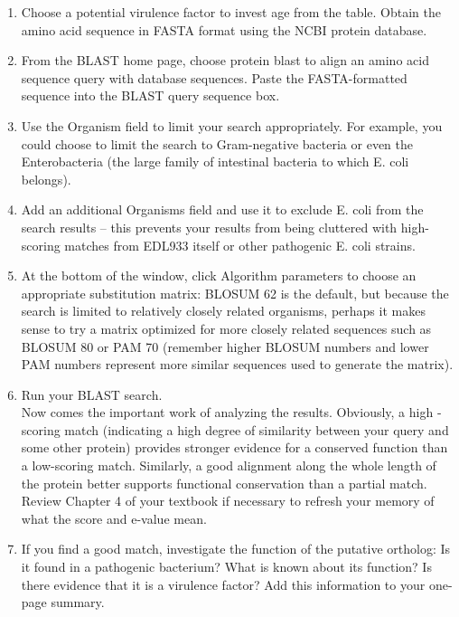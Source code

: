 \begin{enumerate}
	\item Choose a potential virulence factor to invest age from the table.  Obtain the amino acid sequence in FASTA format using the NCBI protein database.

	\item From the BLAST home page, choose protein blast to align an amino acid sequence query with database sequences.  Paste the FASTA-formatted sequence into the BLAST query sequence box.

	\item  Use the Organism field to limit your search appropriately.  For example, you could choose to limit the search to Gram-negative bacteria or even the Enterobacteria (the large family of intestinal bacteria to which E. coli belongs).

	\item Add an additional Organisms field and use it to exclude E. coli from the search results – this prevents your results from being cluttered with high-scoring matches from EDL933 itself or other pathogenic E. coli strains.
	
	\item  At the bottom of the window, click Algorithm parameters to choose an appropriate substitution matrix: BLOSUM 62 is the default, but because the search is limited to relatively closely related organisms, perhaps it makes sense to try a matrix optimized for more closely related sequences such as BLOSUM 80 or PAM 70 (remember higher BLOSUM numbers and lower PAM numbers represent more similar sequences used to generate the matrix).

	\item Run your BLAST search. \\

Now comes the important work of analyzing the results.  Obviously, a high -scoring match (indicating a high degree of similarity between your query and some other protein) provides stronger evidence for a conserved function than a low-scoring match.  Similarly, a good alignment along the whole length of the protein better supports functional conservation than a partial match.  Review Chapter 4 of your textbook if necessary to refresh your memory of what the score and e-value mean.  

	\item  If you find a good match, investigate the function of the putative ortholog: Is it found in a pathogenic bacterium?  What is known about its function?  Is there evidence that it is a virulence factor?  Add this information to your one-page summary.
	

\end{enumerate}
